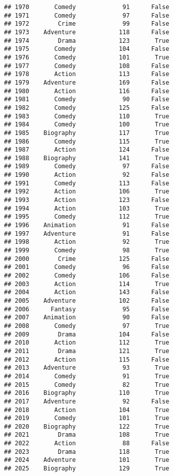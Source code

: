 \documentclass[
]{article}
\begin{document}
\begin{verbatim}
## 1970       Comedy             91      False
## 1971       Comedy             97      False
## 1972        Crime             99      False
## 1973    Adventure            118      False
## 1974        Drama            123       True
## 1975       Comedy            104      False
## 1976       Comedy            101       True
## 1977       Comedy            108      False
## 1978       Action            113      False
## 1979    Adventure            169      False
## 1980       Action            116      False
## 1981       Comedy             90      False
## 1982       Comedy            125      False
## 1983       Comedy            110       True
## 1984       Comedy            100       True
## 1985    Biography            117       True
## 1986       Comedy            115       True
## 1987       Action            124      False
## 1988    Biography            141       True
## 1989       Comedy             97      False
## 1990       Action             92      False
## 1991       Comedy            113      False
## 1992       Action            106       True
## 1993       Action            123      False
## 1994       Action            103       True
## 1995       Comedy            112       True
## 1996    Animation             91      False
## 1997    Adventure             91      False
## 1998       Action             92       True
## 1999       Comedy             98       True
## 2000        Crime            125      False
## 2001       Comedy             96      False
## 2002       Comedy            106      False
## 2003       Action            114       True
## 2004       Action            143      False
## 2005    Adventure            102      False
## 2006      Fantasy             95      False
## 2007    Animation             90      False
## 2008       Comedy             97       True
## 2009        Drama            104      False
## 2010       Action            112       True
## 2011        Drama            121       True
## 2012       Action            115      False
## 2013    Adventure             93       True
## 2014       Comedy             91       True
## 2015       Comedy             82       True
## 2016    Biography            110       True
## 2017    Adventure             92      False
## 2018       Action            104       True
## 2019       Comedy            101       True
## 2020    Biography            122       True
## 2021        Drama            108       True
## 2022       Action             88      False
## 2023        Drama            118       True
## 2024    Adventure            101       True
## 2025    Biography            129       True

\end{verbatim}
\end{document}
